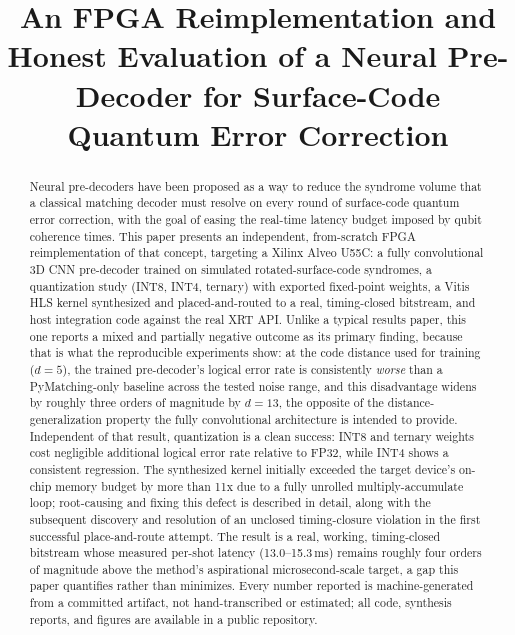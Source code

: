 \documentclass[conference]{IEEEtran}
\begin{document}
\title{An FPGA Reimplementation and Honest Evaluation of a Neural Pre-Decoder for Surface-Code Quantum Error Correction}

\author{
}

\maketitle

\begin{abstract}
Neural pre-decoders have been proposed as a way to reduce the syndrome volume that a classical matching decoder must resolve on every round of surface-code quantum error correction, with the goal of easing the real-time latency budget imposed by qubit coherence times. This paper presents an independent, from-scratch FPGA reimplementation of that concept, targeting a Xilinx Alveo U55C: a fully convolutional 3D CNN pre-decoder trained on simulated rotated-surface-code syndromes, a quantization study (INT8, INT4, ternary) with exported fixed-point weights, a Vitis HLS kernel synthesized and placed-and-routed to a real, timing-closed bitstream, and host integration code against the real XRT API. Unlike a typical results paper, this one reports a mixed and partially negative outcome as its primary finding, because that is what the reproducible experiments show: at the code distance used for training (\(d=5\)), the trained pre-decoder's logical error rate is consistently \emph{worse} than a PyMatching-only baseline across the tested noise range, and this disadvantage widens by roughly three orders of magnitude by \(d=13\), the opposite of the distance-generalization property the fully convolutional architecture is intended to provide. Independent of that result, quantization is a clean success: INT8 and ternary weights cost negligible additional logical error rate relative to FP32, while INT4 shows a consistent regression. The synthesized kernel initially exceeded the target device's on-chip memory budget by more than 11x due to a fully unrolled multiply-accumulate loop; root-causing and fixing this defect is described in detail, along with the subsequent discovery and resolution of an unclosed timing-closure violation in the first successful place-and-route attempt. The result is a real, working, timing-closed bitstream whose measured per-shot latency (13.0--15.3\,ms) remains roughly four orders of magnitude above the method's aspirational microsecond-scale target, a gap this paper quantifies rather than minimizes. Every number reported is machine-generated from a committed artifact, not hand-transcribed or estimated; all code, synthesis reports, and figures are available in a public repository.
\end{abstract}
\end{document}
